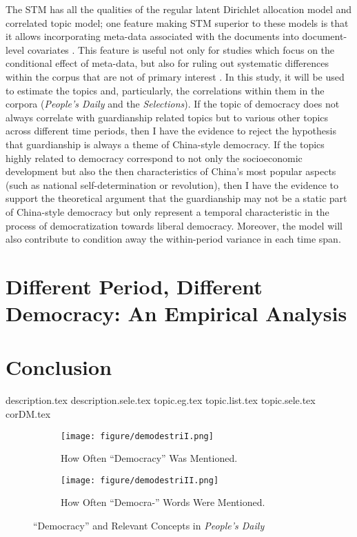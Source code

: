 \documentclass[abstracton,UTF8]{ctexart}
\begin{document}
The STM has all the qualities of the regular latent Dirichlet allocation model and correlated topic model; one feature making STM superior to these models is that it allows incorporating meta-data associated with the documents into document-level covariates \citep{Lucas2015}. This feature is useful not only for studies which focus on the conditional effect of meta-data, but also for ruling out systematic differences within the corpus that are not of primary interest \citep[10]{Lucas2015}. In this study, it will be used to estimate the topics and, particularly, the correlations within them in the corpora (\textit{People's Daily} and the \textit{Selections}). If the topic of democracy does not always correlate with guardianship related topics but to various other topics across different time periods, then I have the evidence to reject the hypothesis that guardianship is always a theme of China-style democracy. If the topics highly related to democracy correspond to not only the socioeconomic development but also the then characteristics of China's most popular aspects (such as national self-determination or revolution), then I have the evidence to support the theoretical argument that the guardianship may not be a static part of China-style democracy but only represent a temporal characteristic in the process of democratization towards liberal democracy. Moreover, the model will also contribute to condition away the within-period variance in each time span.





\section{Different Period, Different Democracy: An Empirical Analysis}

\section{Conclusion}





\clearpage
\appendix
\appendixpage
\addappheadtotoc

{description.tex}
{description.sele.tex}
{topic.eg.tex}
{topic.list.tex}
{topic.sele.tex}
{corDM.tex}

\begin{figure}[htbp]
	\begin{subfigure}{0.6\textwidth}
		\texttt{[image: figure/demodestriI.png]}
		\caption{How Often ``Democracy'' Was Mentioned.}
		\label{f:descDemI}
	\end{subfigure}
	\begin{subfigure}{0.6\textwidth}
		\texttt{[image: figure/demodestriII.png]}
		\caption{How Often ``Democra-'' Words Were Mentioned.}
		\label{f:descDemII}
	\end{subfigure}
	\caption{``Democracy'' and Relevant Concepts in \textit{People's Daily}}
	\label{f:descDem}
\end{figure}
\end{document}
